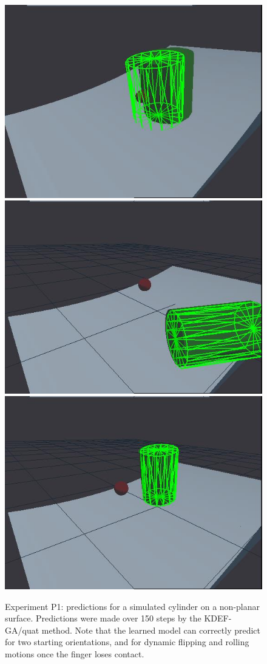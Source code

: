 \begin{figure}[htbp]
{}
\centerline{
\includegraphics[width=\imgwid]{./A00295}
\includegraphics[width=\imgwid]{./B00550}
\includegraphics[width=\imgwid]{./C01100}
}
\caption {Experiment P1: predictions for a simulated cylinder on a non-planar surface. Predictions were made over 150 steps by the KDEF-GA/quat method. Note that the learned model can correctly predict for two starting orientations, and for dynamic flipping and rolling motions once the finger loses contact.
\label{fig:ExperimentL1-uneven}}
\end{figure}


